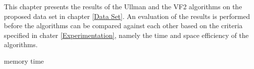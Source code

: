 \label{Experiment Results}
This chapter presents the results of the Ullman and the VF2 algorithms on the proposed data set in chapter \ref{Data Set}. An evaluation of the results is
performed before the algorithms can be compared against each other based on the criteria specified in chater \ref{Experimentation}, namely the time and 
space efficiency of the algorithms.

{memory}
{time}

\newpage
